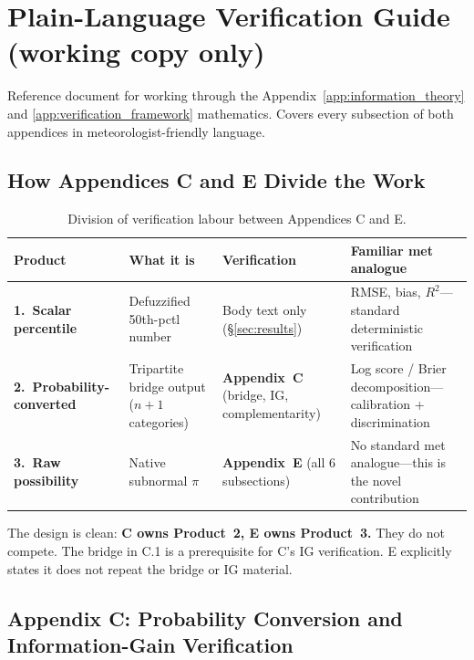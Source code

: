 \RaggedRight

\section{Plain-Language Verification Guide \textnormal{(working copy only)}}\label{app:plain_language}

Reference document for working through the Appendix~\ref{app:information_theory} and \ref{app:verification_framework} mathematics. Covers every subsection of both appendices in meteorologist-friendly language.

\subsection{How Appendices C and E Divide the Work}\label{sec:ce_division}

\begin{table}[htbp]
\centering
\small
\caption{Division of verification labour between Appendices C and E.}
\label{tab:ce_division}
\begin{tabularx}{\columnwidth}{>{\raggedright\arraybackslash}p{}>{\raggedright\arraybackslash}p{}>{\raggedright\arraybackslash}p{}X}
\toprule
Product & What it is & Verification & Familiar met analogue \\
\midrule
\textbf{1.\ Scalar percentile} & Defuzzified 50th-pctl number & Body text only (\S\ref{sec:results}) & RMSE, bias, $R^2$---standard deterministic verification \\
\textbf{2.\ Probability-converted} & Tripartite bridge output ($n{+}1$ categories) & \textbf{Appendix~C} (bridge, IG, complementarity) & Log score / Brier decomposition---calibration + discrimination \\
\textbf{3.\ Raw possibility} & Native subnormal $\pi$ & \textbf{Appendix~E} (all 6 subsections) & No standard met analogue---this is the novel contribution \\
\bottomrule
\end{tabularx}
\end{table}

The design is clean: \textbf{C owns Product~2, E owns Product~3.} They do not compete. The bridge in C.1 is a prerequisite for C's IG verification. E explicitly states it does not repeat the bridge or IG material.

\subsection{Appendix C: Probability Conversion and Information-Gain Verification}\label{sec:plain_c}

